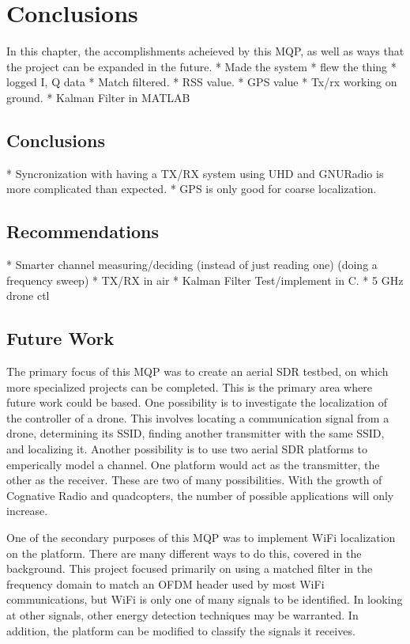 \chapter{Conclusions}
In this chapter, the accomplishments acheieved by this MQP, as well as ways that 
the project can be expanded in the future. 
 * Made the system
 * flew the thing
 * logged I, Q data
 * Match filtered.
 * RSS value.
 * GPS value
 * Tx/rx working on ground.
 * Kalman Filter in MATLAB

\section{Conclusions} %
 * Syncronization with having a TX/RX system using UHD and GNURadio is more complicated than expected.
 * GPS is only good for coarse localization.

\section{Recommendations}
 * Smarter channel measuring/deciding (instead of just reading one) (doing a frequency sweep)
 * TX/RX in air
 * Kalman Filter Test/implement in C.
 * 5 GHz drone ctl


\section{Future Work}
The primary focus of this MQP was to create an aerial SDR testbed, on which more 
specialized projects can be completed. This is the primary area where future work
could be based. One possibility is to investigate the localization of the controller
of a drone. This involves locating a communication signal from a drone, determining its
SSID, finding another transmitter with the same SSID, and localizing it. Another possibility
is to use two aerial SDR platforms to emperically model a channel. One platform
would act as the transmitter, the other as the receiver. These are two of many possibilities.
With the growth of Cognative Radio and quadcopters, the number of possible applications
will only increase.\par

One of the secondary purposes of this MQP was to implement WiFi localization on 
the platform. There are many different ways to do this, covered in the background.
This project focused primarily on using a matched filter in the frequency domain to match
an OFDM header used by most WiFi communications, but WiFi is only one of many 
signals to be identified. In looking at other signals, other energy detection
techniques may be warranted. In addition, the platform can be modified to 
classify the signals it receives.\par

